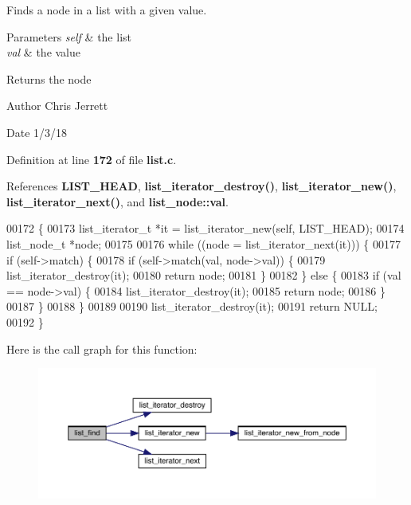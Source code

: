 Finds a node in a list with a given value. 


\begin{DoxyParams}{Parameters}
{\em self} & the list \\
\hline
{\em val} & the value \\
\hline
\end{DoxyParams}
\begin{DoxyReturn}{Returns}
the node 
\end{DoxyReturn}
\begin{DoxyAuthor}{Author}
Chris Jerrett 
\end{DoxyAuthor}
\begin{DoxyDate}{Date}
1/3/18 
\end{DoxyDate}


Definition at line \textbf{ 172} of file \textbf{ list.\+c}.



References \textbf{ L\+I\+S\+T\+\_\+\+H\+E\+AD}, \textbf{ list\+\_\+iterator\+\_\+destroy()}, \textbf{ list\+\_\+iterator\+\_\+new()}, \textbf{ list\+\_\+iterator\+\_\+next()}, and \textbf{ list\+\_\+node\+::val}.


\begin{DoxyCode}
00172                                                 \{
00173   list_iterator_t *it = list_iterator_new(\textcolor{keyword}{self}, LIST_HEAD);
00174   list_node_t *node;
00175 
00176   \textcolor{keywordflow}{while} ((node = list_iterator_next(it))) \{
00177     \textcolor{keywordflow}{if} (self->match) \{
00178       \textcolor{keywordflow}{if} (self->match(val, node->val)) \{
00179         list_iterator_destroy(it);
00180         \textcolor{keywordflow}{return} node;
00181       \}
00182     \} \textcolor{keywordflow}{else} \{
00183       \textcolor{keywordflow}{if} (val == node->val) \{
00184         list_iterator_destroy(it);
00185         \textcolor{keywordflow}{return} node;
00186       \}
00187     \}
00188   \}
00189 
00190   list_iterator_destroy(it);
00191   \textcolor{keywordflow}{return} NULL;
00192 \}
\end{DoxyCode}
Here is the call graph for this function\+:\nopagebreak
\begin{figure}[H]
\begin{center}
\leavevmode
\includegraphics[width=350pt]{list_8c_a5d73352b7bfa0c5a8b33289d7b27a374_cgraph}
\end{center}
\end{figure}
\mbox{\label{list_8c_a97f6f9590b1cdedd5367b9139e9cc4ef}} 
